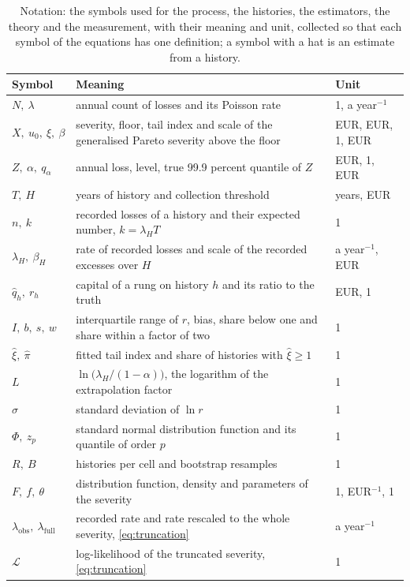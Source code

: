 \begin{table}[htbp]
\centering\small
\caption{Notation: the symbols used for the process, the histories, the estimators, the theory and the measurement, with their meaning and unit, collected so that each symbol of the equations has one definition; a symbol with a hat is an estimate from a history.}
\label{tab:notation}
\begin{tabularx}{\textwidth}{lXl}
\toprule
Symbol & Meaning & Unit \\
\midrule
$N,\ \lambda$ & annual count of losses and its Poisson rate & 1, a year$^{-1}$ \\
$X,\ u_0,\ \xi,\ \beta$ & severity, floor, tail index and scale of the generalised Pareto severity above the floor & EUR, EUR, 1, EUR \\
$Z,\ \alpha,\ q_\alpha$ & annual loss, level, true 99.9 percent quantile of $Z$ & EUR, 1, EUR \\
$T,\ H$ & years of history and collection threshold & years, EUR \\
$n,\ k$ & recorded losses of a history and their expected number, $k=\lambda_H T$ & 1 \\
$\lambda_H,\ \beta_H$ & rate of recorded losses and scale of the recorded excesses over $H$ & a year$^{-1}$, EUR \\
$\hat q_h,\ r_h$ & capital of a rung on history $h$ and its ratio to the truth & EUR, 1 \\
$I,\ b,\ s,\ w$ & interquartile range of $r$, bias, share below one and share within a factor of two & 1 \\
$\hat\xi,\ \hat\pi$ & fitted tail index and share of histories with $\hat\xi\ge1$ & 1 \\
$L$ & $\ln\bigl(\lambda_H/(1-\alpha)\bigr)$, the logarithm of the extrapolation factor & 1 \\
$\sigma$ & standard deviation of $\ln r$ & 1 \\
$\Phi,\ z_p$ & standard normal distribution function and its quantile of order $p$ & 1 \\
$R,\ B$ & histories per cell and bootstrap resamples & 1 \\
$F,\ f,\ \theta$ & distribution function, density and parameters of the severity & 1, EUR$^{-1}$, 1 \\
$\lambda_{\mathrm{obs}},\ \lambda_{\mathrm{full}}$ & recorded rate and rate rescaled to the whole severity, \cref{eq:truncation} & a year$^{-1}$ \\
$\mathcal{L}$ & log-likelihood of the truncated severity, \cref{eq:truncation} & 1 \\

\end{tabularx}
\end{table}
